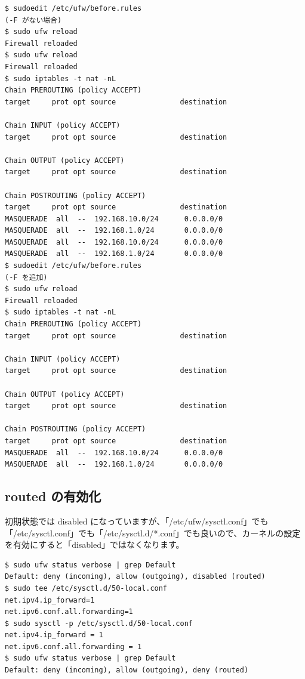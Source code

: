 \documentclass[mingoth,a4paper]{jsarticle}
\begin{document}
\begin{verbatim}
$ sudoedit /etc/ufw/before.rules
(-F がない場合)
$ sudo ufw reload
Firewall reloaded
$ sudo ufw reload
Firewall reloaded
$ sudo iptables -t nat -nL
Chain PREROUTING (policy ACCEPT)
target     prot opt source               destination

Chain INPUT (policy ACCEPT)
target     prot opt source               destination

Chain OUTPUT (policy ACCEPT)
target     prot opt source               destination

Chain POSTROUTING (policy ACCEPT)
target     prot opt source               destination
MASQUERADE  all  --  192.168.10.0/24      0.0.0.0/0
MASQUERADE  all  --  192.168.1.0/24       0.0.0.0/0
MASQUERADE  all  --  192.168.10.0/24      0.0.0.0/0
MASQUERADE  all  --  192.168.1.0/24       0.0.0.0/0
$ sudoedit /etc/ufw/before.rules
(-F を追加)
$ sudo ufw reload
Firewall reloaded
$ sudo iptables -t nat -nL
Chain PREROUTING (policy ACCEPT)
target     prot opt source               destination

Chain INPUT (policy ACCEPT)
target     prot opt source               destination

Chain OUTPUT (policy ACCEPT)
target     prot opt source               destination

Chain POSTROUTING (policy ACCEPT)
target     prot opt source               destination
MASQUERADE  all  --  192.168.10.0/24      0.0.0.0/0
MASQUERADE  all  --  192.168.1.0/24       0.0.0.0/0
\end{verbatim}

\subsection{routed の有効化}

初期状態では disabled になっていますが、「/etc/ufw/sysctl.conf」でも「/etc/sysctl.conf」でも「/etc/sysctl.d/*.conf」でも良いので、カーネルの設定を有効にすると「disabled」ではなくなります。

\begin{verbatim}
$ sudo ufw status verbose | grep Default
Default: deny (incoming), allow (outgoing), disabled (routed)
$ sudo tee /etc/sysctl.d/50-local.conf
net.ipv4.ip_forward=1
net.ipv6.conf.all.forwarding=1
$ sudo sysctl -p /etc/sysctl.d/50-local.conf
net.ipv4.ip_forward = 1
net.ipv6.conf.all.forwarding = 1
$ sudo ufw status verbose | grep Default
Default: deny (incoming), allow (outgoing), deny (routed)
\end{verbatim}
\end{document}
